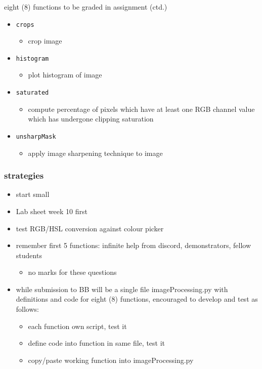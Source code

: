 \documentclass[english,14pt]{beamer}
\begin{document}
\begin{frame}[fragile]

\frametitle{}

eight (8) functions to be graded in assignment (ctd.)

\begin{itemize}
	\item \texttt{crops}
	\begin{itemize}
		\item crop image
	\end{itemize}
		
	\item \texttt{histogram}
	\begin{itemize}
		\item plot histogram of image
	\end{itemize}
			
	\item \texttt{saturated}
	\begin{itemize}
		\item compute percentage of pixels which have at least one RGB channel value which has undergone clipping saturation
	\end{itemize}
			
	\item \texttt{unsharpMask}
	\begin{itemize}
		\item apply image sharpening technique to image
	\end{itemize}
\end{itemize}

\end{frame}


\begin{frame}[fragile]

\frametitle{strategies}

\begin{itemize}
	\item start small
	\item Lab sheet week 10 first
	\item test RGB/HSL conversion against colour picker
	\item remember first 5 functions: infinite help from discord, demonstrators, fellow students
	\begin{itemize}
		\item no marks for these questions
	\end{itemize}
	\item while submission to BB will be a single file imageProcessing.py with definitions and code for eight (8) functions, encouraged to develop and test as follows:
	\begin{itemize}
		\item each function own script, test it
		\item define code into function in same file, test it
		\item copy/paste working function into imageProcessing.py
	\end{itemize}
\end{itemize}

\end{frame}
\end{document}
